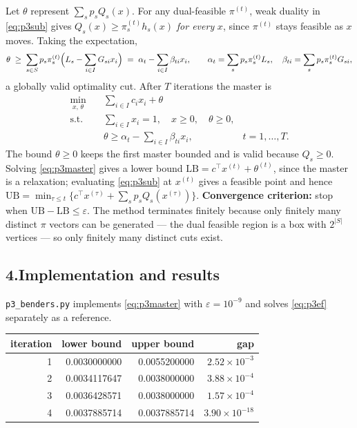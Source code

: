 \documentclass[11pt]{article}
\DeclareMathOperator*{\minimize}{min}
\newcommand{\T}{^{\!\top}}
\theoremstyle{definition}
\begin{document}
Let $\theta$ represent $\sum_s p_s Q_s(x)$. For any dual-feasible
$\pi^{(t)}$, weak duality in \eqref{eq:p3sub} gives
$Q_s(x) \ge \pi_s^{(t)} h_s(x)$ \emph{for every} $x$, since
$\pi^{(t)}$ stays feasible as $x$ moves. Taking the expectation,
\begin{equation}\label{eq:p3cut}
  \theta \;\ge\; \sum_{s \in S} p_s \pi_s^{(t)}
    \Bigl( L_s - \sum_{i \in I} G_{si} x_i \Bigr)
  \;=\; \alpha_t - \sum_{i \in I} \beta_{ti} x_i,
  \qquad
  \alpha_t = \sum_{s} p_s \pi^{(t)}_s L_s, \quad
  \beta_{ti} = \sum_{s} p_s \pi^{(t)}_s G_{si},
\end{equation}
a globally valid optimality cut. After $T$ iterations the master is
\begin{equation}\label{eq:p3master}
\begin{aligned}
  \minimize_{x,\,\theta}\quad & \sum_{i \in I} c_i x_i + \theta\\
  \text{s.t.}\quad & \sum_{i \in I} x_i = 1, \quad x \ge 0,
    \quad \theta \ge 0,\\
  & \theta \ge \alpha_t - \sum_{i \in I} \beta_{ti} x_i,
    & t = 1,\dots,T .
\end{aligned}
\end{equation}
The bound $\theta \ge 0$ keeps the first master bounded and is valid
because $Q_s \ge 0$. Solving \eqref{eq:p3master} gives a lower bound
$\mathrm{LB} = c\T x^{(t)} + \theta^{(t)}$, since the master is a
relaxation; evaluating \eqref{eq:p3sub} at $x^{(t)}$ gives a feasible
point and hence
$\mathrm{UB} = \min_{\tau \le t}\{c\T x^{(\tau)} + \sum_s p_s
Q_s(x^{(\tau)})\}$. \textbf{Convergence criterion:} stop when
$\mathrm{UB} - \mathrm{LB} \le \varepsilon$. The method terminates
finitely because only finitely many distinct $\pi$ vectors can be
generated --- the dual feasible region is a box with $2^{|S|}$ vertices
--- so only finitely many distinct cuts exist.

\subsection*{4.\quad Implementation and results}

\texttt{p3\_benders.py} implements \eqref{eq:p3master} with
$\varepsilon = 10^{-9}$ and solves \eqref{eq:p3ef} separately as a
reference.

\begin{center}
\begin{tabular}{@{}rrrr@{}}
\toprule
iteration & lower bound & upper bound & gap\\
\midrule
1 & 0.0030000000 & 0.0055200000 & $2.52 \times 10^{-3}$\\
2 & 0.0034117647 & 0.0038000000 & $3.88 \times 10^{-4}$\\
3 & 0.0036428571 & 0.0038000000 & $1.57 \times 10^{-4}$\\
4 & 0.0037885714 & 0.0037885714 & $3.90 \times 10^{-18}$\\
\bottomrule
\end{tabular}
\end{center}
\end{document}

